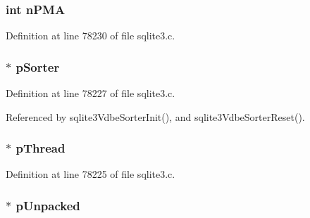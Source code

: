 \hypertarget{struct_sort_subtask_aa69ed0840e0aa406ab50b37e580957c7}{}
\subsubsection[{n\+P\+M\+A}]{\setlength{\rightskip}{0pt plus 5cm}int n\+P\+M\+A}\label{struct_sort_subtask_aa69ed0840e0aa406ab50b37e580957c7}


Definition at line 78230 of file sqlite3.\+c.

\hypertarget{struct_sort_subtask_a4be97d7a48d4328b3f5339ebf2d6aa25}{}
\subsubsection[{p\+Sorter}]{$\ast$ p\+Sorter}\label{struct_sort_subtask_a4be97d7a48d4328b3f5339ebf2d6aa25}


Definition at line 78227 of file sqlite3.\+c.



Referenced by sqlite3\+Vdbe\+Sorter\+Init(), and sqlite3\+Vdbe\+Sorter\+Reset().

\hypertarget{struct_sort_subtask_ab61bdcad5ba38805599ca4a3858fccd8}{}
\subsubsection[{p\+Thread}]{$\ast$ p\+Thread}\label{struct_sort_subtask_ab61bdcad5ba38805599ca4a3858fccd8}


Definition at line 78225 of file sqlite3.\+c.

\hypertarget{struct_sort_subtask_a3c35478dbef83c35370e3230491c4a87}{}
\subsubsection[{p\+Unpacked}]{$\ast$ p\+Unpacked}\label{struct_sort_subtask_a3c35478dbef83c35370e3230491c4a87}


